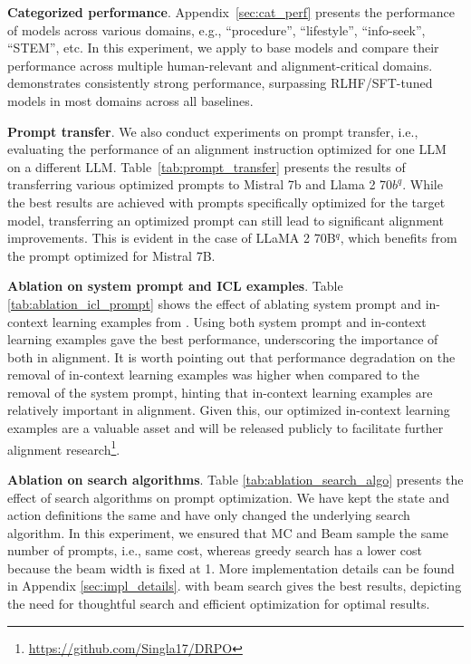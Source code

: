\noindent \textbf{Categorized performance}. 
Appendix~\ref{sec:cat_perf} presents the performance of models across various domains, e.g., ``procedure'', ``lifestyle'', ``info-seek'', ``STEM'', etc. In this experiment, we apply \ours to base models and compare their performance across multiple human-relevant and alignment-critical domains. \ours demonstrates consistently strong performance, surpassing RLHF/SFT-tuned models in most domains across all baselines.





\noindent \textbf{Prompt transfer}. 
We also conduct experiments on prompt transfer, i.e., evaluating the performance of an alignment instruction optimized for one LLM on a different LLM. Table~\ref{tab:prompt_transfer} presents the results of transferring various optimized prompts to Mistral 7b and Llama 2 70$b^q$. While the best results are achieved with prompts specifically optimized for the target model, transferring an optimized prompt can still lead to significant alignment improvements. This is evident in the case of LLaMA 2 70B$^q$, which benefits from the prompt optimized for Mistral 7B.





\noindent \textbf{Ablation on system prompt and  ICL examples}. 
Table \ref{tab:ablation_icl_prompt} shows the effect of ablating system prompt and in-context learning examples from \ours. Using both system prompt and in-context learning examples gave the best performance, underscoring the importance of both in alignment. It is worth pointing out that performance degradation on the removal of in-context learning examples was higher when compared to the removal of the system prompt, hinting that in-context learning examples are relatively important in alignment. Given this, our optimized in-context learning examples are a valuable asset and will be released publicly to facilitate further alignment research\footnote{\url{https://github.com/Singla17/DRPO}}.




\noindent \textbf{Ablation on search algorithms}. 
Table \ref{tab:ablation_search_algo} presents the effect of search algorithms on prompt optimization. We have kept the state and action definitions the same and have only changed the underlying search algorithm.  In this experiment, we ensured that MC and Beam sample the same number of prompts, i.e., same cost, whereas greedy search has a lower cost because the beam width is fixed at 1. More implementation details can be found in Appendix \ref{sec:impl_details}. \ours with beam search gives the best results, depicting the need for thoughtful search and efficient optimization for optimal results.

